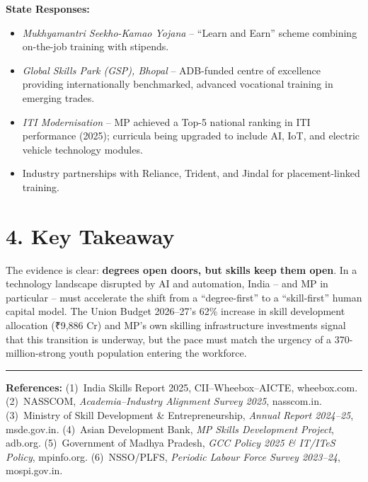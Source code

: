 \documentclass[11pt,a4paper]{article}
\newcommand{\rupee}{\textrm{\fontspec{Calibri}₹}}
\begin{document}
\textbf{State Responses:}
\begin{itemize}
  \item \textit{Mukhyamantri Seekho-Kamao Yojana} -- ``Learn and Earn'' scheme combining on-the-job training with stipends.
  \item \textit{Global Skills Park (GSP), Bhopal} -- ADB-funded centre of excellence providing internationally benchmarked, advanced vocational training in emerging trades.
  \item \textit{ITI Modernisation} -- MP achieved a Top-5 national ranking in ITI performance (2025); curricula being upgraded to include AI, IoT, and electric vehicle technology modules.
  \item Industry partnerships with Reliance, Trident, and Jindal for placement-linked training.
\end{itemize}

\vspace{0.15cm}
\section{4. Key Takeaway}

The evidence is clear: \textbf{degrees open doors, but skills keep them open}. In a technology landscape disrupted by AI and automation, India -- and MP in particular -- must accelerate the shift from a ``degree-first'' to a ``skill-first'' human capital model. The Union Budget 2026--27's 62\% increase in skill development allocation (\rupee9,886 Cr) and MP's own skilling infrastructure investments signal that this transition is underway, but the pace must match the urgency of a 370-million-strong youth population entering the workforce.

\vspace{0.25cm}
\noindent\rule{\textwidth}{0.5pt}
{\scriptsize\textbf{References:}
(1)~India Skills Report 2025, CII--Wheebox--AICTE, wheebox.com.
(2)~NASSCOM, \textit{Academia--Industry Alignment Survey 2025}, nasscom.in.
(3)~Ministry of Skill Development \& Entrepreneurship, \textit{Annual Report 2024--25}, msde.gov.in.
(4)~Asian Development Bank, \textit{MP Skills Development Project}, adb.org.
(5)~Government of Madhya Pradesh, \textit{GCC Policy 2025 \& IT/ITeS Policy}, mpinfo.org.
(6)~NSSO/PLFS, \textit{Periodic Labour Force Survey 2023--24}, mospi.gov.in.
}
\end{document}
